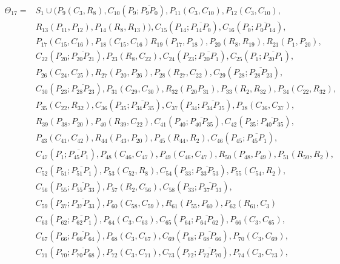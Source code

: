 \begin{align*}
\Theta_{17} =  & S_{1} \cup (P_{9}(C_{3}, R_{8}),  C_{10}(P_{9};\overline{P_{9} P_{0}}), P_{11}(C_{3}, C_{10}), P_{12}(C_{3}, C_{10}), \\
& R_{13}(P_{11}, P_{12}), P_{14}(R_{8}, R_{13})), C_{15}(P_{14};\overline{P_{14} P_{0}}), C_{16}(P_{0}; \overline{P_{0} P_{14}}), \\ 
& P_{17}(C_{15}, C_{16}), P_{18}(C_{15}, C_{16}) R_{19}(P_{17}, P_{18}), P_{20}(R_{8}, R_{19}), R_{21}(P_{1},P_{20}), \\ 
& C_{22}(P_{20};\overline{P_{20} P_{21}}), P_{23}(R_{8}, C_{22}), C_{24}(P_{23};\overline{P_{20} P_{1}}), C_{25}(P_{1};\overline{P_{20} P_{1}}),\\ 
& P_{26}(C_{24}, C_{25}), R_{27}(P_{20}, P_{26}), P_{28}(R_{27}, C_{22}), C_{29}(P_{28};\overline{P_{28} P_{23}}), \\ 
& C_{30}(P_{23}; \overline{P_{28} P_{23}}), P_{31}(C_{29}, C_{30}), R_{32}(P_{20} P_{31}), P_{33} (R_{2}, R_{32}), P_{34}(C_{22},R_{32}), \\ 
& P_{35}(C_{22},R_{32}), C_{36}(P_{35};\overline{P_{34} P_{35}}), C_{37}(P_{34};\overline{P_{34} P_{35}}), P_{38}(C_{36},C_{37}), \\
& R_{39}(P_{38}, P_{20}), P_{40}(R_{39}, C_{22}), C_{41}(P_{40};\overline{P_{40} P_{35}}), C_{42}(P_{35};\overline{P_{40} P_{35}}), \\
& P_{43}(C_{41}, C_{42}), R_{44}(P_{43}, P_{20}), P_{45}(R_{44}, R_{2}), C_{46}(P_{45};\overline{P_{45} P_{1}}), \\
& C_{47}(P_{1};\overline{P_{45} P_{1}}), P_{48}(C_{46}, C_{47}), P_{49}(C_{46}, C_{47}), R_{50}(P_{48}, P_{49}), P_{51}(R_{50}, R_{2}), \\
& C_{52}(P_{51};\overline{P_{51} P_{1}}), P_{53}(C_{52}, R_{8}), C_{54}(P_{33};\overline{P_{33} P_{53}}), P_{55}(C_{54}, R_{2}), \\
& C_{56}(P_{55};\overline{P_{55} P_{33}}), P_{57}(R_{2},C_{56}), C_{58}(P_{33};\overline{P_{37} P_{33}}), \\
& C_{59}(P_{37};\overline{P_{37} P_{33}}), P_{60}(C_{58},C_{59}), R_{61}(P_{55},P_{60}), P_{62}(R_{61}, C_{3}) \\
&C_{63}(P_{62};\overline{P_{62} P_{1}}), P_{64}(C_{3}, C_{63}), C_{65}(P_{64};\overline{P_{64} P_{62}}), P_{66}(C_{3}, C_{65}),\\
&C_{67}(P_{66};\overline{P_{66} P_{64}}), P_{68}(C_{3}, C_{67}), C_{69}(P_{68};\overline{P_{68} P_{66}}), P_{70}(C_{3}, C_{69}),\\
&C_{71}(P_{70};\overline{P_{70} P_{68}}), P_{72}(C_{3}, C_{71}), C_{73}(P_{72};\overline{P_{72} P_{70}}), P_{74}(C_{3}, C_{73}),\\

\end{align*}
